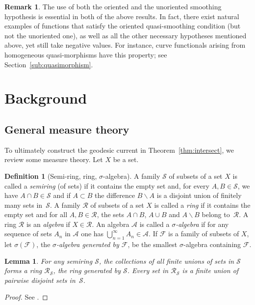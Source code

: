 \documentclass[11pt]{amsart}
\numberwithin{equation}{section}
\numberwithin{figure}{section}
\newtheorem{lemma}[theorem]{Lemma}
\theoremstyle{definition}
\newtheorem{remark}[theorem]{Remark}
\newtheorem{definition}[theorem]{Definition}
\theoremstyle{plain}
\newcommand\cA{\ensuremath{\mathcal{A}}}
\newcommand\cF{\ensuremath{\mathcal{F}}}
\begin{document}
\begin{remark}
The use of both the oriented and the unoriented smoothing hypothesis
is essential in both of the above results. In fact, there exist
natural examples of functions that satisfy the oriented
quasi-smoothing condition (but not the unoriented one), as well as all
the other necessary hypotheses mentioned above, yet still take
negative values. For instance, curve functionals arising from
homogeneous quasi-morphisms have this property; see
Section~\ref{sub:quasimorphism}.
\end{remark}





\section{Background}
\label{sec:backround}

\subsection{General measure theory}
\label{subsec:backround}

To ultimately construct the geodesic current in Theorem~\ref{thm:intersect}, we review some measure theory.
Let $X$ be a set.

\begin{definition}[Semi-ring, ring, $\sigma$-algebra]
  A family $\mathcal{S}$ of subsets of a set $X$ is called a
  \emph{semiring} (of sets) if it contains the empty set and, for
  every $A,B \in \mathcal{S}$, we have
  $A \cap B \in \mathcal{S}$ and if $A \subset B$ the difference
  $B \backslash A$ is a disjoint union of finitely many sets
  in~$\mathcal{S}$. A family $\mathcal{R}$ of subsets of a set $X$ is
  called a \emph{ring} if it contains the empty set and for all
  $A,B \in \mathcal{R}$, the sets $A \cap B$, $A \cup B$ and
  $A \backslash B$ belong to~$\mathcal{R}$.  A ring $\mathcal{R}$ is an \emph{algebra} if $X \in \mathcal{R}$. An algebra $\cA$ is called a \emph{$\sigma$-algebra} if for any sequence of sets $A_n$ in $\cA$ one has $\bigcup_{n=1}^{\infty} A_n \in \cA$.
If $\cF$ is a family of subsets of $X$, let $\sigma(\cF)$, the \emph{$\sigma$-algebra generated by $\mathcal{F}$}, be the smallest $\sigma$-algebra containing $\mathcal{F}$.
  \label{def:semiring}
\end{definition}

\begin{lemma}
  For any semiring $\mathcal{S}$, the collections of all finite unions
  of sets in $\mathcal{S}$ forms a ring $\mathcal{R}_{\mathcal{S}}$,
  the \emph{ring generated by $\mathcal{S}$}. Every set in
  $\mathcal{R}_{\mathcal{S}}$ is a finite union of pairwise disjoint
  sets in~$\mathcal{S}$.
\end{lemma}
\begin{proof}
See \cite[1.2.14~Lemma]{Bo07:MeasureTheory}.
\end{proof}
\end{document}
